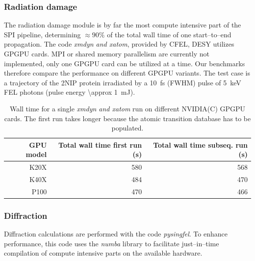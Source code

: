 \documentclass[10pt]{scrartcl}
\begin{document}
\subsubsection{Radiation damage}
The radiation damage module is by far the most compute intensive part of the SPI
pipeline, determining $\approx 90\%$ of the total wall time
\cite{wall_time_footnote} of one
start--to--end propagation. The code \textit{xmdyn and xatom}, provided by
CFEL, DESY \cite{Jurek2016} utilizes GPGPU cards. MPI or shared memory
parallelism are currently not implemented, only one GPGPU card can
be utilized at a time. Our benchmarks therefore compare the performance on
different GPGPU variants. The test case is a trajectory of the 2NIP protein
irradiated by a \SI{10}{\femto\second} (FWHM) pulse of
\SI{5}{\kilo\electronvolt} FEL photons (pulse energy \SI{\approx 1}{\milli\joule}).
%
\begin{table}
  \centering
  \begin{tabular}{rrr}
    \textbf{GPU model} & \textbf{Total wall time first run (s)} & \textbf{Total
    wall time subseq. run (s)}\\
    \hline
    K20X  & 580 & 568 \\
    K40X  & 484 & 470 \\
    P100  & 470 & 466 \\
  \end{tabular}
  \caption{Wall time for a single \textit{xmdyn and xatom} run on different
NVIDIA(C) GPGPU cards.
The first run takes longer because the atomic transition database
has to be populated.}
  \label{tab:xmdyn_performance_nvidia}
\end{table}
%
\subsubsection{Diffraction}
%
Diffraction calculations are performed with the code \textit{pysingfel}. To
enhance performance, this code uses the \textit{numba} library to facilitate
just--in--time compilation of compute intensive parts on the available hardware.
\end{document}
